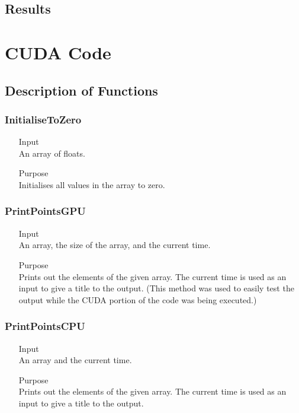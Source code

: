 \documentclass[11pt,a4paper]{article}
\begin{document}
\subsection{Results}


\section{CUDA Code}
\subsection{Description of Functions}
\subsubsection{InitialiseToZero}
\begin{itemize}
	\item[Input] \hfill\\
	An array of floats.
	\item[Purpose] \hfill\\
	Initialises all values in the array to zero.
\end{itemize}

\subsubsection{PrintPointsGPU}
\begin{itemize}
	\item[Input] \hfill\\
	An array, the size of the array, and the current time.
	\item[Purpose] \hfill\\
	Prints out the elements of the given array. The current time is used as an input to give a title to the output. (This method was used to easily test the output while the CUDA portion of the code was being executed.)
\end{itemize}

\subsubsection{PrintPointsCPU}
\begin{itemize}
	\item[Input] \hfill\\
	An array and the current time.
	\item[Purpose] \hfill\\
	Prints out the elements of the given array. The current time is used as an input to give a title to the output.
\end{itemize}
\end{document}
